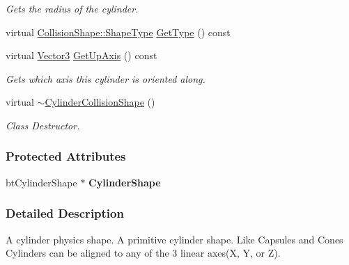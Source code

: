\begin{DoxyCompactItemize}
\begin{DoxyCompactList}\small\item\em Gets the radius of the cylinder. \item\end{DoxyCompactList}\item 
virtual \hyperlink{classphys_1_1CollisionShape_af3ba4fd8af5b9557f912d2f5ff35a588}{CollisionShape::ShapeType} \hyperlink{classphys_1_1CylinderCollisionShape_ae1cb7d5ad4611e86fb0d2f2bb1d8b4c4}{GetType} () const 
\item 
virtual \hyperlink{classphys_1_1Vector3}{Vector3} \hyperlink{classphys_1_1CylinderCollisionShape_ab92f7f763c501f02c377ed43f42d62cd}{GetUpAxis} () const 
\begin{DoxyCompactList}\small\item\em Gets which axis this cylinder is oriented along. \item\end{DoxyCompactList}\item 
\hypertarget{classphys_1_1CylinderCollisionShape_adc169486e49aa49ed1849c6ddc7deab1}{
virtual \hyperlink{classphys_1_1CylinderCollisionShape_adc169486e49aa49ed1849c6ddc7deab1}{$\sim$CylinderCollisionShape} ()}
\label{classphys_1_1CylinderCollisionShape_adc169486e49aa49ed1849c6ddc7deab1}

\begin{DoxyCompactList}\small\item\em Class Destructor. \item\end{DoxyCompactList}\end{DoxyCompactItemize}
\subsubsection*{Protected Attributes}
\begin{DoxyCompactItemize}
\item 
\hypertarget{classphys_1_1CylinderCollisionShape_a6230dab0af08f8a540ef0925a00e5962}{
btCylinderShape $\ast$ {\bfseries CylinderShape}}
\label{classphys_1_1CylinderCollisionShape_a6230dab0af08f8a540ef0925a00e5962}

\end{DoxyCompactItemize}


\subsubsection{Detailed Description}
A cylinder physics shape. A primitive cylinder shape. Like Capsules and Cones Cylinders can be aligned to any of the 3 linear axes(X, Y, or Z). 

